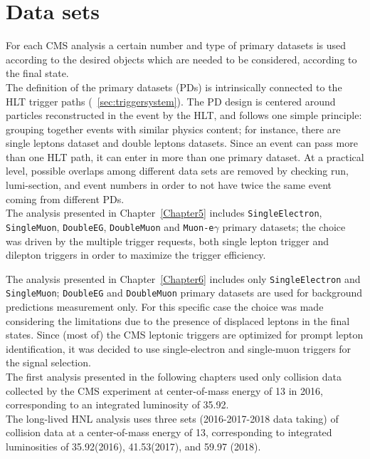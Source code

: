 \section{Data sets}\label{sec:c4data}

For each CMS analysis a certain number and type of primary datasets is used
according to the desired objects which are needed to be considered,
\ie according to the final state.\\
The definition of the primary datasets (PDs) is intrinsically connected to
the HLT trigger paths (~\ref{sec:triggersystem}). The PD design is centered
around particles reconstructed in the event by the HLT, and follows one simple principle:
grouping together events with similar physics content; for instance, there are
single leptons dataset and double leptons datasets.
Since an event can pass more than one HLT path,
it can enter in more than one primary dataset. At a practical level, possible overlaps among different data sets are
removed by checking run, lumi-section, and event numbers in order to not have twice the same event coming from different PDs.\\


The analysis presented in Chapter~\ref{Chapter5} includes
\texttt{SingleElectron}, \texttt{SingleMuon}, \texttt{DoubleEG},
\texttt{DoubleMuon} and \texttt{Muon-e$\gamma$} primary datasets; the choice was driven by the
multiple trigger requests, both single lepton trigger and
dilepton triggers in order to maximize the trigger efficiency.

The analysis presented in Chapter~\ref{Chapter6} includes only
\texttt{SingleElectron} and \texttt{SingleMuon}; \texttt{DoubleEG} and
\texttt{DoubleMuon} primary datasets are used for background
predictions measurement only. For this specific case the choice was
made considering the limitations due to the presence of displaced
leptons in the final states.
Since (most of) the CMS leptonic triggers are
optimized for prompt lepton identification, it was decided
to use single-electron and single-muon triggers for the
signal selection.\\

The first analysis presented in the following chapters used only 
\Pp collision data collected
by the CMS experiment at center-of-mass energy of 13\TeV
in 2016, corresponding to an integrated luminosity of 35.92\fbinv.\\

The long-lived HNL analysis uses three sets (2016-2017-2018 data
taking) of \Pp collision data at a
center-of-mass energy of 13\TeV, corresponding to integrated
luminosities of 35.92\fbinv (2016), 41.53\fbinv (2017), and 59.97\fbinv
(2018). 

